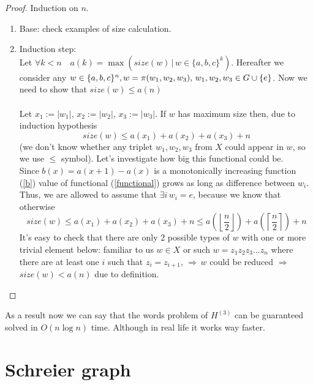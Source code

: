 \documentclass[a4paper,12pt]{amsart}
\begin{document}
\begin{proof}
	Induction on $n$.
	\begin{enumerate}
		\item Base: check examples of size calculation.
		\item Induction step:\\
		Let $\forall k < n \quad a (k) = \max (size(w) \,|\, w \in \{a,b,c\}^k)$. Hereafter we consider any $w \in \{a, b, c\}^{n}, \,\\ w = \pi (w_1, w_2, w_3), \, w_1, w_2, w_3 \in G \cup \{e\}$. Now we need to show that $size(w) \le a(n)$\\
		\\
		Let $ x_1 := |w_1|, \, x_2 := |w_2|, \, x_3 := |w_3|$. If $w$ has maximum size then, due to induction hypothesis \\
		\begin{equation}
		\label{functional}
		size(w) \le a(x_1) + a(x_2) + a(x_3) + n
		\end{equation}
		(we don't know whether any triplet $w_1, w_2, w_3$ from $X$ could appear in $w$, so we use $\le$ symbol). Let's investigate how big this functional could be.\\

		Since $b(x) = a(x + 1) - a(x)$ is a monotonically increasing function (\ref{b}) value of functional (\ref{functional})
		grows as long as difference between $w_i$. Thus,
		we are allowed to assume that $\exists i \, w_i = e$, because we know that otherwise
		$$size(w) \le a(x_1) + a(x_2) + a(x_3) + n \le a\left(
			\left\lfloor
				\frac{n}{2}
			\right\rfloor
		\right) + a \left(
			\left\lceil
				\frac{n}{2}
			\right\rceil
		\right) + n$$
		It's easy to check that there are only 2 possible types of $w$ with one or more trivial element below: familiar to us $w \in X$ or such $w = z_1 z_2 z_3 ... z_n$ where there are at least one $i$ such that $z_i = z_{i+1}, \, \Rightarrow \, w$ could be reduced $\Rightarrow$ $size(w) < a(n)$ due to definition.
	\end{enumerate}

\end{proof}


As a result now we can say that the words problem of $H^{(3)}$ can be guaranteed solved in $O(n \log n)$ time.
Although in real life it works way faster.


\section{Schreier graph}
\end{document}
